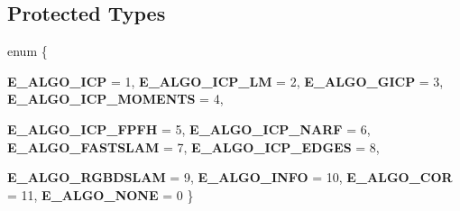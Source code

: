 \subsection*{Protected Types}
\begin{DoxyCompactItemize}
\item 
enum \{ \par
{\bfseries E\_\-ALGO\_\-ICP} = 1, 
{\bfseries E\_\-ALGO\_\-ICP\_\-LM} = 2, 
{\bfseries E\_\-ALGO\_\-GICP} = 3, 
{\bfseries E\_\-ALGO\_\-ICP\_\-MOMENTS} = 4, 
\par
{\bfseries E\_\-ALGO\_\-ICP\_\-FPFH} = 5, 
{\bfseries E\_\-ALGO\_\-ICP\_\-NARF} = 6, 
{\bfseries E\_\-ALGO\_\-FASTSLAM} = 7, 
{\bfseries E\_\-ALGO\_\-ICP\_\-EDGES} = 8, 
\par
{\bfseries E\_\-ALGO\_\-RGBDSLAM} = 9, 
{\bfseries E\_\-ALGO\_\-INFO} = 10, 
{\bfseries E\_\-ALGO\_\-COR} = 11, 
{\bfseries E\_\-ALGO\_\-NONE} = 0
 \}
\end{DoxyCompactItemize}
